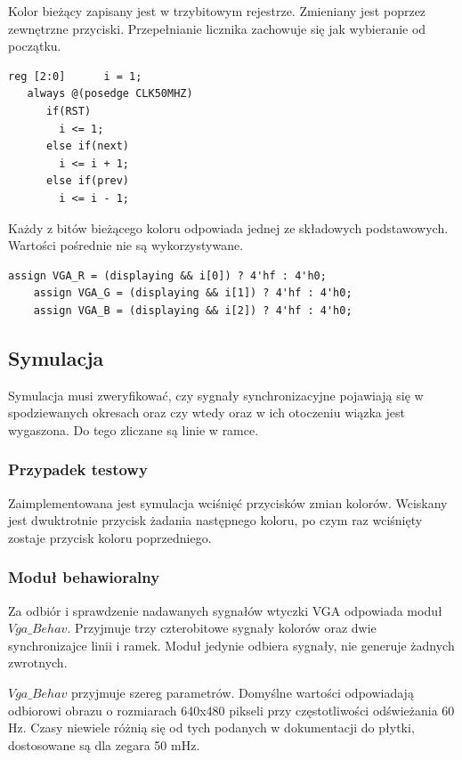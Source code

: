 \documentclass[a4paper,12pt]{article}
\begin{document}
Kolor bieżący zapisany jest w trzybitowym rejestrze. Zmieniany jest poprzez zewnętrzne przyciski. Przepełnianie licznika zachowuje się jak wybieranie od początku.
\begin{lstlisting}[label=Syncvga,caption=Sync.v,firstnumber=16]
   reg [2:0]      i = 1;
   always @(posedge CLK50MHZ)
      if(RST)
        i <= 1;
      else if(next)
        i <= i + 1;
      else if(prev)
        i <= i - 1;
\end{lstlisting}

Każdy z bitów bieżącego koloru odpowiada jednej ze składowych podstawowych. Wartości pośrednie nie są wykorzystywane.
\begin{lstlisting}[label=Syncvga,caption=Sync.v,firstnumber=25]
    assign VGA_R = (displaying && i[0]) ? 4'hf : 4'h0;
    assign VGA_G = (displaying && i[1]) ? 4'hf : 4'h0;
    assign VGA_B = (displaying && i[2]) ? 4'hf : 4'h0;
\end{lstlisting}

\subsection{Symulacja}
Symulacja musi zweryfikować, czy sygnały synchronizacyjne pojawiają się w spodziewanych okresach oraz czy wtedy oraz w ich otoczeniu wiązka jest wygaszona. Do tego zliczane są linie w ramce.

\subsubsection{Przypadek testowy}
Zaimplementowana jest symulacja wciśnięć przycisków zmian kolorów. Wciskany jest dwuktrotnie przycisk żadania następnego koloru, po czym raz wciśnięty zostaje przycisk koloru poprzedniego.

\subsubsection{Moduł behawioralny}
Za odbiór i sprawdzenie nadawanych sygnałów wtyczki VGA odpowiada moduł $Vga\_Behav$. Przyjmuje trzy czterobitowe sygnały kolorów oraz dwie synchronizajce linii i ramek. Moduł jedynie odbiera sygnały, nie generuje żadnych zwrotnych.

$Vga\_Behav$ przyjmuje szereg parametrów. Domyślne wartości odpowiadają odbiorowi obrazu o rozmiarach 640x480 pikseli przy częstotliwości odświeżania 60 Hz. Czasy niewiele różnią się od tych podanych w dokumentacji do płytki, dostosowane są dla zegara 50 mHz.
\end{document}
